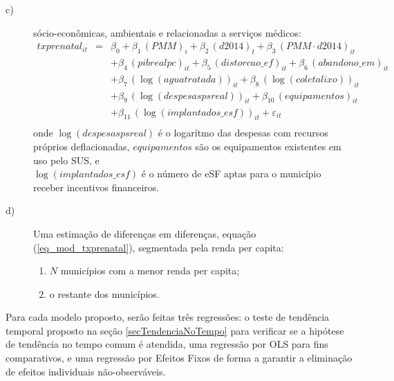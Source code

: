 \documentclass[twoside,onecolumn,12pt]{article}
\numberwithin{outputctr}{section}
\begin{document}
\begin{enumerate}
\begin{description}
    \item[c)] s\'{o}cio-econ\^{o}micas, ambientais e relacionadas a servi\c{c}os m\'{e}dicos:
    \begin{equation}
    \begin{array}{rcl}
     txprenatal_{it} & = & \beta_0 + \beta_1 \, (PMM)_{i} + \beta_2 \, (d2014)_{t} + \beta_3 \, (PMM \cdot d2014)_{it} \\
     ~               & ~ & + \beta_4 \, (pibrealpc)_{it} + \beta_5 \, (distorcao\_ef)_{it} + \beta_6 \, (abandono\_em)_{it} \\
     ~               & ~ & + \beta_7 \, (\log{(aguatratada)})_{it} + \beta_8 \, (\log{(coletalixo)})_{it} \\
     ~               & ~ & + \beta_9 \, (\log{(despesaspsreal)})_{it} + \beta_{10} \, (equipamentos)_{it} \\
     ~               & ~ &  + \beta_{11} \, (\log{(implantados\_esf)})_{it} + \varepsilon_{it}\\
    \end{array}
    \label{eq_mod_txprenatal_cov3}
    \end{equation}
    \noindent onde 
    $\log{(despesaspsreal)}$ \'{e} o logar\'{i}tmo das despesas com recursos pr\'{o}prios deflacionadas,
    $equipamentos$ s\~{a}o os equipamentos existentes em uso pelo SUS, e \\
    $\log{(implantados\_esf)}$ \'{e} o n\'{u}mero de eSF aptas para o munic\'{i}pio receber incentivos financeiros.

 \item[d)] Uma estima\c{c}\~{a}o de diferen\c{c}as em diferen\c{c}as, equação (\ref{eq_mod_txprenatal}),
  segmentada pela renda per capita:
   \begin{enumerate}
    \item $N$ munic\'{i}pios com a menor renda per capita;
    \item o restante dos munic\'{i}pios.
   \end{enumerate}
 
  \end{description}
\end{enumerate}

Para cada modelo proposto, ser\~{a}o feitas tr\^{e}s regress\~{o}es: o teste de tend\^{e}ncia temporal proposto na se\c{c}\~{a}o \ref{secTendenciaNoTempo} para verificar se a hip\'{o}tese de tend\^{e}ncia no tempo comum \'{e} atendida, uma regress\~{a}o por OLS para fins comparativos, e uma regress\~{a}o por Efeitos Fixos de forma a garantir a elimina\c{c}\~{a}o de efeitos individuais n\~{a}o-observ\'{a}veis.
\end{document}
